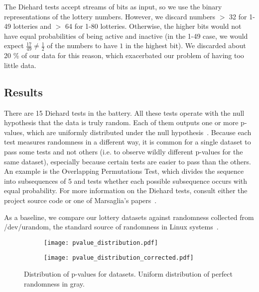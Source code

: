 The Diehard tests accept streams of bits as input, so we use the binary representations of the lottery numbers.  However, we discard numbers $>$ 32 for 1-49 lotteries and $>$ 64 for 1-80 lotteries. Otherwise, the higher bits would not have equal probabilities of being active and inactive (in the 1-49 case, we would expect $\frac{17}{49} \neq \frac{1}{2}$ of the numbers to have $1$ in the highest bit). We discarded about 20 \% of our data for this reason, which exacerbated our problem of having too little data.

\subsection{Results}

There are 15 Diehard tests in the battery. All these tests operate with the null hypothesis that the data is truly random. Each of them outputs one or more p-values, which are uniformly distributed under the null hypothesis~\cite{NISTBible}. Because each test measures randomness in a different way, it is common for a single dataset to pass some tests and not others (i.e. to observe wildly different p-values for the same dataset), especially because certain tests are easier to pass than the others. An example is the Overlapping Permutations Test, which divides the sequence into subsequences of 5 and tests whether each possible subsequence occurs with equal probability. For more information on the Diehard tests, consult either the project source code or one of Marsaglia's papers~\cite{monkey,mindist}.

As a baseline, we compare our lottery datasets against randomness collected from /dev/urandom, the standard source of randomness in Linux systems~\cite{manrandom,mythsrandom}. 


\begin{figure}
    \centering
    \captionsetup[subfigure]{justification=centering}
    \begin{subfigure}{0.495\textwidth}
        \texttt{[image: pvalue\_distribution.pdf]}
        \label{fig:pvalue_distribution}
    \end{subfigure}
    \hfill
    \begin{subfigure}{0.495\textwidth}
        \texttt{[image: pvalue\_distribution\_corrected.pdf]}
        \label{fig:pvalue_corrected}
    \end{subfigure}
    \caption{Distribution of p-values for datasets. Uniform distribution of perfect randomness in gray.}
\end{figure}

